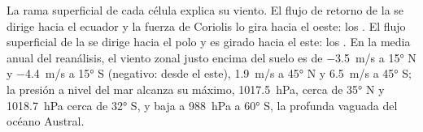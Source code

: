 La rama superficial de cada célula explica su viento. El flujo de retorno de la  se dirige hacia el ecuador y la fuerza de Coriolis lo gira hacia el oeste: los . El flujo superficial de la  se dirige hacia el polo y es girado hacia el este: los . En la media anual del reanálisis, el viento zonal justo encima del suelo es de \qty{-3.5}{m/s} a \ang{15} N y \qty{-4.4}{m/s} a \ang{15} S (negativo: desde el este), \qty{+1.9}{m/s} a \ang{45} N y \qty{+6.5}{m/s} a \ang{45} S; la presión a nivel del mar alcanza su máximo, \qty{1017.5}{hPa}, cerca de \ang{35} N y \qty{1018.7}{hPa} cerca de \ang{32} S, y baja a \qty{988}{hPa} a \ang{60} S, la profunda vaguada del océano Austral.

